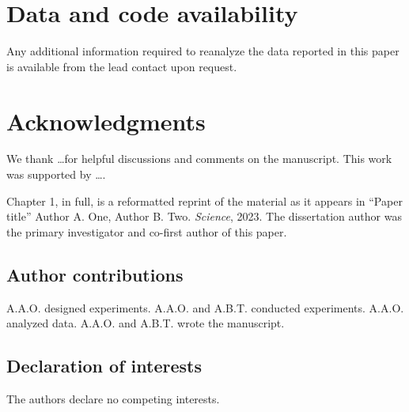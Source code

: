 \section{Data and code availability}

Any additional information required to reanalyze the data reported in this paper is available from the lead contact upon request. 

\section{Acknowledgments}

We thank \dots for helpful discussions and comments on the manuscript. This work was supported by \dots.

Chapter 1,  in full,  is  a  reformatted  reprint  of  the  material as it appears in “Paper title”  Author A. One, Author B. Two. \textit{Science}, 2023.  The dissertation author was the primary investigator and co-first author of this paper.

\subsection{Author contributions}
A.A.O. designed experiments. A.A.O. and A.B.T. conducted experiments. A.A.O. analyzed data. A.A.O. and A.B.T. wrote the manuscript.

\subsection{Declaration of interests}
The authors declare no competing interests.
